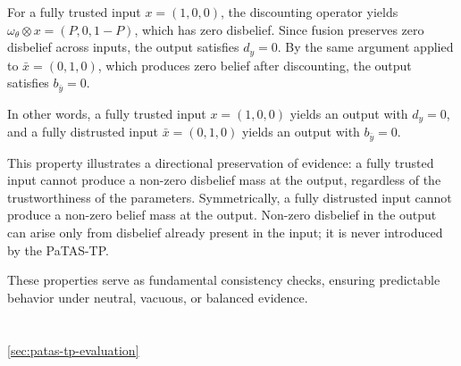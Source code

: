 \begin{remark}
For a fully trusted input $x = (1,0,0)$, the discounting operator yields $\omega_\theta \otimes x = (P, 0, 1-P)$, which has zero disbelief. Since fusion preserves zero disbelief across inputs, the output satisfies $d_y = 0$. By the same argument applied to $\bar{x} = (0,1,0)$, which produces zero belief after discounting, the output satisfies $b_{\bar{y}} = 0$. 

In other words, a fully trusted input $x = (1,0,0)$ yields an output with $d_y = 0$, and a fully distrusted input $\bar{x} = (0,1,0)$ yields an output with $b_{\bar{y}} = 0$. 

This property illustrates a directional preservation of evidence: a fully trusted input cannot produce a non-zero disbelief mass at the output, regardless of the trustworthiness of the parameters. Symmetrically, a fully distrusted input cannot produce a non-zero belief mass at the output. Non-zero disbelief in the output can arise only from disbelief already present in the input; it is never introduced by the \ac{PaTAS-TP}.
\end{remark}

These properties serve as fundamental consistency checks, ensuring predictable behavior under neutral, vacuous, or balanced evidence.


\DIFaddbegin \section{}
\label{sec:inference-trust}

\cref{sec:patas-tp-evaluation}

